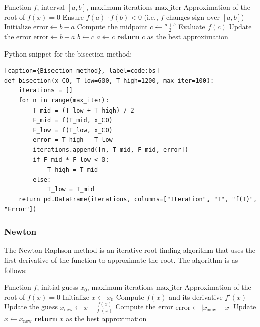 \documentclass[10pt]{article}
\begin{document}
\begin{algorithm}[H]
\caption{Bisection Method}
\begin{algorithmic}[1]
\Require Function \( f \), interval \([a, b]\), maximum iterations \( \text{max\_iter} \)
\Ensure Approximation of the root of \( f(x) = 0 \)
\State Ensure \( f(a) \cdot f(b) < 0 \) (i.e., \( f \) changes sign over \([a, b]\))
\State Initialize \( \text{error} \gets b - a \)
    \State Compute the midpoint \( c \gets \frac{a + b}{2} \)
    \State Evaluate \( f(c) \)
    \State Update the error \( \text{error} \gets b - a \)
        \State \( b \gets c \)
    \Else
        \State \( a \gets c \)
    \EndIf
\EndFor
\State \textbf{return} \( c \) as the best approximation
\end{algorithmic}
\end{algorithm}

Python snippet for the bisection method:
\begin{lstlisting}[style=custompython][caption={Bisection method}, label=code:bs]
def bisection(x_CO, T_low=600, T_high=1200, max_iter=100):
    iterations = []
    for n in range(max_iter):
        T_mid = (T_low + T_high) / 2
        F_mid = f(T_mid, x_CO)
        F_low = f(T_low, x_CO)
        error = T_high - T_low
        iterations.append([n, T_mid, F_mid, error])
        if F_mid * F_low < 0:
            T_high = T_mid
        else:
            T_low = T_mid
    return pd.DataFrame(iterations, columns=["Iteration", "T", "f(T)", "Error"])
\end{lstlisting}

\subsubsection{Newton}
The Newton-Raphson method is an iterative root-finding algorithm that uses the first derivative of the function to approximate the root. The algorithm is as follows:
\begin{algorithm}[H]
\caption{Newton Method}
\begin{algorithmic}[1]
\Require Function \( f \), initial guess \( x_0 \), maximum iterations \( \text{max\_iter} \)
\Ensure Approximation of the root of \( f(x) = 0 \)
\State Initialize \( x \gets x_0 \)
    \State Compute \( f(x) \) and its derivative \( f'(x) \)
    \State Update the guess \( x_{\text{new}} \gets x - \frac{f(x)}{f'(x)} \)
    \State Compute the error \( \text{error} \gets |x_{\text{new}} - x| \)
    \State Update \( x \gets x_{\text{new}} \)
\EndFor
\State \textbf{return} \( x \) as the best approximation
\end{algorithmic}
\end{algorithm}
\end{document}
